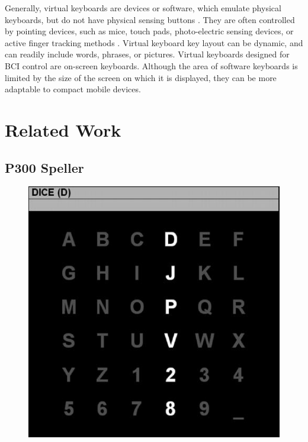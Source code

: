 \documentclass[12pt,titlepage]{article}
\begin{document}
Generally, virtual keyboards are devices or software, which emulate physical keyboards, but do 
not have physical sensing buttons \cite{kolsch2002keyboards}.  They are often controlled by pointing devices, such as mice, 
touch pads, photo-electric sensing devices, or active finger tracking methods \cite{kolsch2002keyboards}.  Virtual 
keyboard key layout can be dynamic, and can readily include words, phrases, or pictures.  Virtual keyboards designed for BCI control are on-screen keyboards.  Although the area of 
software keyboards is limited by the size of the screen on which it is displayed, they can be 
more adaptable to compact mobile devices.

\section{Related Work}

\subsection{P300 Speller}

\begin{figure}[t]
\begin{center}
	\includegraphics[scale=0.40]{Figure2.jpeg}
	\label{fig:P300}
\end{center}
\end{figure}
\end{document}
